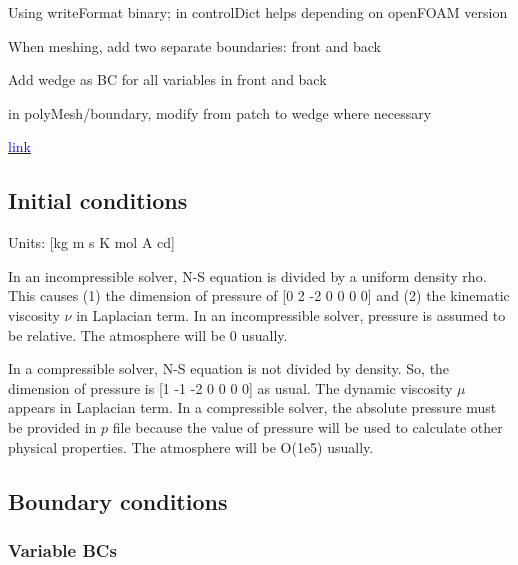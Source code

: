 \documentclass[a4paper, 12pt]{article}
\numberwithin{equation}{section}
\newcommand{\code}{\fontfamily{pcr}\selectfont}
\newcommand{\blue}[1]{\textcolor{blue}{#1}}
\begin{document}
            Using {\code writeFormat binary;} in {\code controlDict} helps depending on openFOAM version

            When meshing, add two separate boundaries: front and back

            Add {\code wedge} as BC for all variables in front and back

            in {\code polyMesh/boundary}, modify from {\code patch} to {\code wedge} where necessary

            \href{https://www.youtube.com/watch?v=MUGnlYncqck}{\blue{link}}

            \begin{center}
            \end{center}

    \subsection{Initial conditions}

        Units: [kg m s K mol A cd]

        In an incompressible solver, N-S equation is divided by a uniform density rho. This causes (1) the dimension of pressure of [0 2 -2 0 0 0 0] and (2) the kinematic viscosity $\nu$ in Laplacian term. In an incompressible solver, pressure is assumed to be relative. The atmosphere will be 0 usually.

        In a compressible solver, N-S equation is not divided by density. So, the dimension of pressure is [1 -1 -2 0 0 0 0] as usual. The dynamic viscosity $\mu$ appears in Laplacian term. In a compressible solver, the absolute pressure must be provided in $p$ file because the value of pressure will be used to calculate other physical properties. The atmosphere will be O(1e5) usually.

    \subsection{Boundary conditions}

        \subsubsection{Variable BCs}
\end{document}
